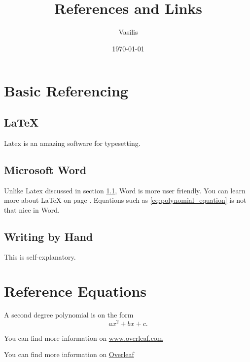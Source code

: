 \documentclass{article}
\title{References and Links}
\author{Vasilis}
\date{\today}
\begin{document}
\maketitle

\tableofcontents

\section{Basic Referencing}

\subsection{LaTeX}\label{sec:Latex-section}
Latex is an amazing software for typesetting.

\subsection{Microsoft Word}
Unlike Latex discussed in section \ref{sec:Latex-section}, Word is more user friendly. You can learn more about LaTeX on page \pageref{sec:Latex-section}. Equations such as \eqref{eq:polynomial_equation} is not that nice in Word.

\subsection{Writing by Hand}
This is self-explanatory.

\newpage

\section{Reference Equations}
A second degree polynomial is on the form
\begin{equation}
	\label{eq:polynomial_equation}
ax^{2} + bx + c.
\end{equation}

You can find more information on \url{www.overleaf.com}

You can find more information on \href{www.overleaf.com}{Overleaf}
\end{document}
